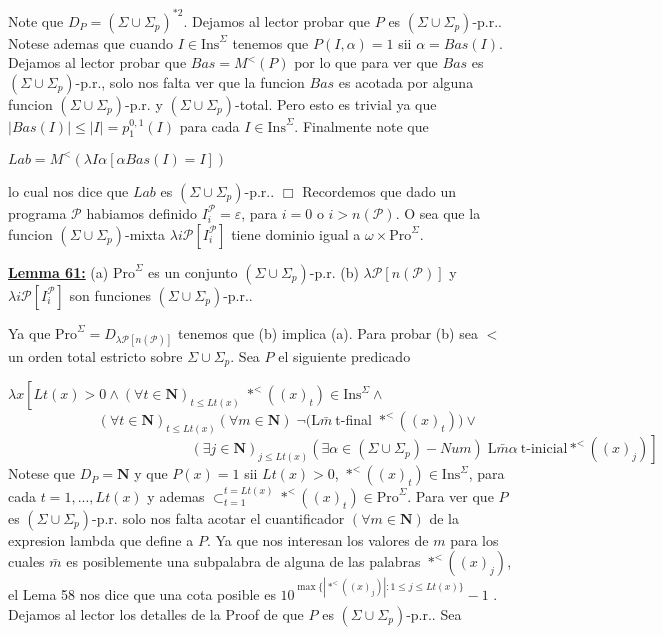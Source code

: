 Note que \(D_{P}=(\Sigma \cup \Sigma _{p})^{\ast 2}\). Dejamos al lector probar que \(P\) es \((\Sigma \cup \Sigma _{p})\)-p.r.. Notese ademas que cuando \(I\in \mathrm{Ins}^{\Sigma }\) tenemos que \(P(I,\alpha )=1\) sii \(\alpha =Bas(I)\). Dejamos al lector probar que \(Bas=M^{< }\left( P\right) \) por lo que para ver que \(Bas\) es \((\Sigma \cup \Sigma _{p})\)-p.r., solo nos falta ver que la funcion \(Bas\) es acotada por alguna funcion \((\Sigma \cup \Sigma _{p})\)-p.r. y \((\Sigma \cup \Sigma _{p})\)-total. Pero esto es trivial ya que \(\left\vert Bas(I)\right\vert \leq \left\vert I\right\vert =p_{1}^{0,1}(I)\) para cada \(I\in \mathrm{Ins}^{\Sigma }\).
Finalmente note que

\(\displaystyle Lab=M^{< }\left( \lambda I\alpha \left[ \alpha Bas(I)=I\right] \right) \)

lo cual nos dice que \(Lab\) es \((\Sigma \cup \Sigma _{p})\)-p.r.. \(\Box\)
Recordemos que dado un programa \(\mathcal{P}\) habiamos definido \(I_{i}^{ \mathcal{P}}=\varepsilon \), para \(i=0\) o \(i >n(\mathcal{P}).\) O sea que la funcion \((\Sigma \cup \Sigma _{p})\)-mixta \(\lambda i\mathcal{P}\left[ I_{i}^{ \mathcal{P}}\right] \) tiene dominio igual a \(\omega \times \mathrm{Pro} ^{\Sigma }\).

\textbf{\underline{Lemma 61:}}
(a) \(\mathrm{Pro}^{\Sigma }\) es un conjunto \((\Sigma \cup \Sigma _{p}) \)-p.r.
(b) \(\lambda \mathcal{P}\left[ n(\mathcal{P})\right] \) y \(\lambda i \mathcal{P}\left[ I_{i}^{\mathcal{P}}\right] \) son funciones \((\Sigma \cup \Sigma _{p})\)-p.r..

\PROOF Ya que \(\mathrm{Pro}^{\Sigma }=D_{\lambda \mathcal{P}\left[ n(\mathcal{P}) \right] }\) tenemos que (b) implica (a). Para probar (b) sea \(< \) un orden total estricto sobre \(\Sigma \cup \Sigma _{p}\). Sea \(P\) el siguiente predicado

\(\lambda x\left[ Lt(x) >0\wedge (\forall t\in \mathbf{N})_{t\leq Lt(x)}\;\ast ^{< }((x)_{t})\in \mathrm{Ins}^{\Sigma }\wedge \right. \)
\(\ \ \ \ \ \ \ \ \ \ \ \ \ \ \ \ \ \ \ \ \ \ \ \ \ \ \ \ \ (\forall t\in \mathbf{N})_{t\leq Lt(x)}(\forall m\in \mathbf{N})\;\lnot (\mathrm{L} \bar{m}\ \)t-final \(\ast ^{< }((x)_{t}))\vee \)
\(\ \ \ \ \ \ \ \ \ \ \ \ \ \ \ \ \ \ \ \ \ \ \ \ \ \ \ \ \ \ \ \ \ \ \ \ \ \ \ \ \ \ \ \ \ \ \ \ \ \ \ \ \ \ \ \ \ \ \ \left. (\exists j\in \mathbf{ N})_{j\leq Lt(x)}(\exists \alpha \in (\Sigma \cup \Sigma _{p})-Num)\;\mathrm{ L}\bar{m}\alpha \ \text{t-inicial}\ast ^{< }((x)_{j})\right] \)
Notese que \(D_{P}=\mathbf{N}\) y que \(P(x)=1\) sii \(Lt(x) >0\), \(\ast ^{< }((x)_{t})\in \mathrm{Ins}^{\Sigma }\), para cada \(t=1,...,Lt(x)\) y ademas \(\subset _{t=1}^{t=Lt(x)}\ast ^{< }((x)_{t})\in \mathrm{Pro}^{\Sigma }\). Para ver que \(P\) es \((\Sigma \cup \Sigma _{p})\)-p.r. solo nos falta acotar el cuantificador \((\forall m\in \mathbf{N})\) de la expresion lambda que define a \(P\). Ya que nos interesan los valores de \(m\) para los cuales \(\bar{m}\) es posiblemente una subpalabra de alguna de las palabras \(\ast ^{< }((x)_{j})\), el Lema 58 nos dice que una cota posible es \( 10^{\max \{\left\vert \ast ^{< }((x)_{j})\right\vert :1\leq j\leq Lt(x)\}}-1\) . Dejamos al lector los detalles de la Proof de que \(P\) es \((\Sigma \cup \Sigma _{p})\)-p.r.. Sea

